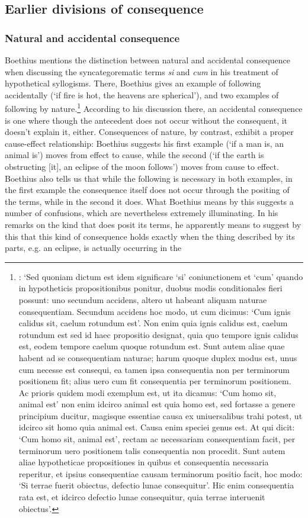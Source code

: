 \documentclass[]{article}
\begin{document}
\subsection{Earlier divisions of consequence}
\subsubsection{Natural and accidental consequence}
Boethius mentions the distinction between natural and accidental consequence when discussing the syncategorematic terms \textit{si} and \textit{cum} in his treatment of hypothetical syllogisms. There, Boethius gives an example of following accidentally (`if fire is hot, the heavens are spherical'), and two examples of following by nature.\footnote{\autocite[I, c. 3, par. 6-7, pp. 219-220]{BHS}: `Sed quoniam dictum est idem significare `si' coniunctionem et `cum' quando in hypotheticis propositionibus ponitur, duobus modis conditionales fieri possunt: uno secundum accidens, altero ut habeant aliquam naturae consequentiam. Secundum accidens hoc modo, ut cum dicimus: `Cum ignis calidus sit, caelum rotundum est'. Non enim quia ignis calidus est, caelum rotundum est sed id haec propositio designat, quia quo tempore ignis calidus est, eodem tempore caelum quoque rotundum est. Sunt autem aliae quae habent ad se consequentiam naturae; harum quoque duplex modus est, unus cum necesse est consequi, ea tamen ipsa consequentia non per terminorum positionem fit; alius uero cum fit consequentia per terminorum positionem. Ac prioris quidem modi exemplum est, ut ita dicamus: `Cum homo sit, animal est' non enim idcirco animal est quia homo est, sed fortasse a genere principium ducitur, magisque essentiae causa ex uniuersalibus trahi potest, ut idcirco sit homo quia animal est. Causa enim speciei genus est. At qui dicit: `Cum homo sit, animal est', rectam ac necessariam consequentiam facit, per terminorum uero positionem talis consequentia non procedit. Sunt autem aliae hypotheticae propositiones in quibus et consequentia necessaria reperitur, et ipsius consequentiae causam terminorum positio facit, hoc modo: `Si terrae fuerit obiectus, defectio lunae consequitur'. Hic enim consequentia rata est, et idcirco defectio lunae consequitur, quia terrae interuenit obiectus'.} According to his discussion there, an accidental consequence is one where though the antecedent does not occur without the consequent, it doesn't explain it, either. Consequences of nature, by contrast, exhibit a proper cause-effect relationship: Boethius suggests his first example  (`if a man is, an animal is') moves from effect to cause, while the second (`if the earth is obstructing [it], an eclipse of the moon follows') moves from cause to effect. Boethius also tells us that while the following is necessary in both examples, in the first example the consequence itself does not occur through the positing of the terms, while in the second it does. What Boethius means by this suggests a number of confusions, which are nevertheless extremely illuminating. In his remarks on the kind that does posit its terms, he apparently means to suggest by this that this kind of consequence holds exactly when the thing described by its parts, e.g. an eclipse, is actually occurring in the 
\end{document}
